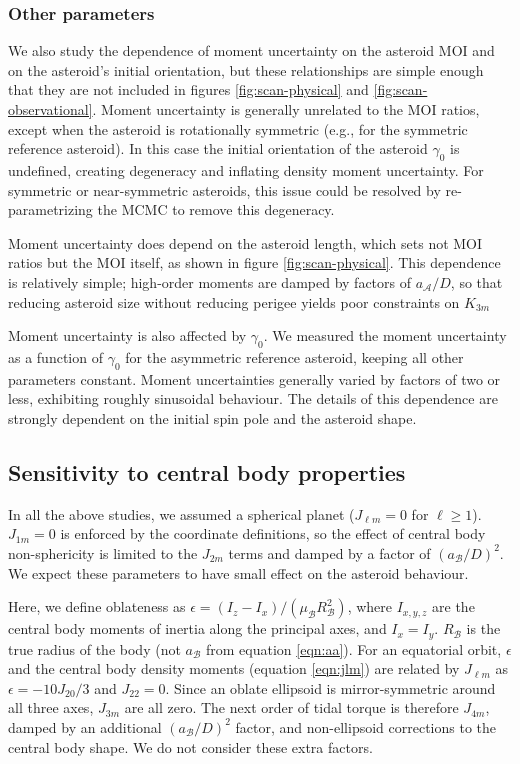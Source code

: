 \documentclass[fleqn,usenatbib]{mnras}
\begin{document}
\subsubsection{Other parameters}

We also study the dependence of moment uncertainty on the asteroid MOI and on the asteroid's initial orientation, but these relationships are simple enough that they are not included in figures \ref{fig:scan-physical} and \ref{fig:scan-observational}. Moment uncertainty is generally unrelated to the MOI ratios, except when the asteroid is rotationally symmetric (e.g., for the symmetric reference asteroid). In this case the initial orientation of the asteroid $\gamma_0$ is undefined, creating degeneracy and inflating density moment uncertainty. For symmetric or near-symmetric asteroids, this issue could be resolved by re-parametrizing the MCMC to remove this degeneracy.

Moment uncertainty does depend on the asteroid length, which sets not MOI ratios but the MOI itself, as shown in figure  \ref{fig:scan-physical}. This dependence is relatively simple; high-order moments are damped by factors of $a_{\mathcal{A}} / D$, so that reducing asteroid size without reducing perigee yields poor constraints on $K_{3m}$

Moment uncertainty is also affected by $\gamma_0$. We measured the moment uncertainty as a function of $\gamma_0$ for the asymmetric reference asteroid, keeping all other parameters constant. Moment uncertainties generally varied by factors of two or less, exhibiting roughly sinusoidal behaviour. The details of this dependence are strongly dependent on the initial spin pole and the asteroid shape.

\subsection{Sensitivity to central body properties}
\label{sec:central-body}

In all the above studies, we assumed a spherical planet ($J_{\ell m} = 0$ for $\ell \geq 1$). $J_{1m} = 0$ is enforced by the coordinate definitions, so the effect of central body non-sphericity is limited to the $J_{2m}$ terms and damped by a factor of $(a_\mathcal{B} / D)^2$. We expect these parameters to have small effect on the asteroid behaviour.

Here, we define oblateness as $\epsilon = (I_z - I_x)/(\mu_\mathcal{B} R_\mathcal{B}^2)$, where $I_{x,y,z}$ are the central body moments of inertia along the principal axes, and $I_x = I_y$. $R_\mathcal{B}$ is the true radius of the body (not $a_\mathcal{B}$ from equation \ref{eqn:aa}). For an equatorial orbit, $\epsilon$ and the central body density moments (equation \ref{eqn:jlm}) are related by $J_{\ell m}$ as $\epsilon = -10J_{20}/3$ and $J_{22} = 0$. Since an oblate ellipsoid is mirror-symmetric around all three axes, $J_{3m}$ are all zero. The next order of tidal torque is therefore $J_{4m}$, damped by an additional $(a_\mathcal{B}/D)^2$ factor, and non-ellipsoid corrections to the central body shape. We do not consider these extra factors.
\end{document}
